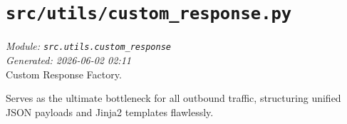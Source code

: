 
\section{\texttt{src/utils/custom\_response.py}}
\textit{Module: \texttt{src.utils.custom\_response}} \\
\textit{Generated: 2026-06-02 02:11} \\

Custom Response Factory.

Serves as the ultimate bottleneck for all outbound traffic, structuring
unified JSON payloads and Jinja2 templates flawlessly.
